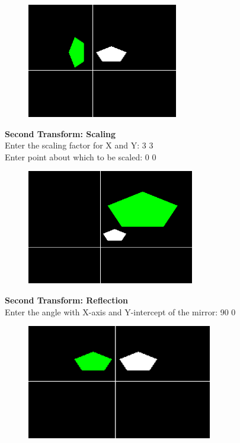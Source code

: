 \documentclass[9pt,letterpaper]{article}
\begin{document}
\begin{figure}[h]
    \centering
    \includegraphics[height=5cm]{CompositeTransformations/Outputs/TranslateRotate.png}
\end{figure}

\newpage

\textbf{\large{Second Transform: Scaling}}\\
Enter the scaling factor for X and Y: 3 3\\
Enter point about which to be scaled: 0 0\\

\begin{figure}[h]
    \centering
    \includegraphics[height=5cm]{CompositeTransformations/Outputs/TranslateScale.png}
\end{figure}

\textbf{\large{Second Transform: Reflection}}\\
Enter the angle with X-axis and Y-intercept of the mirror: 90 0\\

\begin{figure}[h]
    \centering
    \includegraphics[height=5cm]{CompositeTransformations/Outputs/TranslateReflect.png}
\end{figure}
\end{document}
